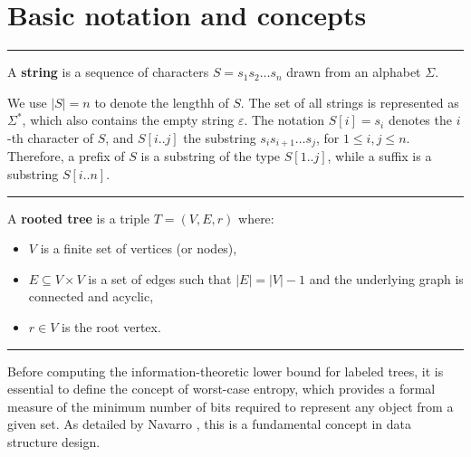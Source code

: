 \section{Basic notation and concepts} \label{sec:notation}

\par\noindent\rule{\textwidth}{0.4pt}

\begin{definition}[String]\label{def:string}
    A \textbf{string} is a sequence of characters $S = s_1s_2\ldots s_n$ drawn from an alphabet $\Sigma$.
\end{definition}
We use $|S| = n$ to denote the lengthh of $S$.
The set of all strings is represented as $\Sigma^*$, which also contains the empty string $\varepsilon$.\newline
The notation $S[i] = s_i$ denotes the $i$-th character of $S$, and $S[i..j]$ the substring $s_is_{i+1}\ldots s_j$, for $1 \leq i,j \leq n$.
Therefore, a prefix of $S$ is a substring of the type $S[1..j]$, while a suffix is a substring $S[i..n]$.


\par\noindent\rule{\textwidth}{0.4pt}

\begin{definition}[Tree] \label{def:rooted_tree}
    A \textbf{rooted tree} is a triple $T = (V, E, r)$ where:
    \begin{itemize}
        \item $V$ is a finite set of vertices (or nodes),
        \item $E\subseteq V \times V$ is a set of edges such that $|E| = |V|-1$ and the underlying graph is connected and acyclic,
        \item $r\in V$ is the root vertex.
    \end{itemize}
\end{definition}


\par\noindent\rule{\textwidth}{0.4pt}

Before computing the information-theoretic lower bound for labeled trees, it is essential to define the concept of worst-case entropy, which provides a formal measure of the minimum number of bits required to represent any object from a given set. As detailed by Navarro \cite{navarro2016compact}, this is a fundamental concept in data structure design.

